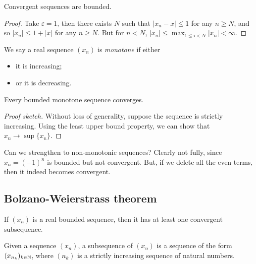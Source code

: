 \documentclass{../template/note}
\begin{document}
    \begin{lemma}
        \label{convergent-bounded}
        Convergent sequences are bounded.
    \end{lemma}
    
    \begin{proof}
        Take \(\varepsilon = 1\), then there exists \(N\) such that \(|x_n - x| \leq 1\) for any \(n \geq N\), and so \(|x_n| \leq 1 + |x|\) for any \(n \geq N\). But for \(n < N\), \(|x_n| \leq \max_{1 \leq i < N}|x_n| < \infty\).
    \end{proof}
    
    \begin{definition}
        We say a real sequence \((x_n)\) is \emph{monotone} if either
        \begin{itemize}
            \item it is increasing;
            \item or it is decreasing.
        \end{itemize}
    \end{definition}
    
    \begin{proposition}
        \label{monotone-convergence}
        Every bounded monotone sequence converges.
    \end{proposition}
    
    \begin{proof}[Proof sketch]
        Without loss of generality, suppose the sequence is strictly increasing. Using the least upper bound property, we can show that \(x_n \to \sup\{x_n\}\).
    \end{proof}
    
    Can we strengthen to non-monotonic sequences? Clearly not fully, since \(x_n = (-1)^n\) is bounded but not convergent. But, if we delete all the even terms, then it indeed becomes convergent.
    
    \subsection{Bolzano-Weierstrass theorem}

    \begin{theorem}
        \label{bw}
        If \((x_n)\) is a real bounded sequence, then it has at least one convergent subsequence.
    \end{theorem}
    
    \begin{definition}[Subsequences]
        Given a sequence \((x_n)\), a subsequence of \((x_n)\) is a sequence of the form \((x_{n_k})_{k \in \mathbb N}\), where \((n_k)\) is a strictly increasing sequence of natural numbers.
    \end{definition}
    
\end{document}
